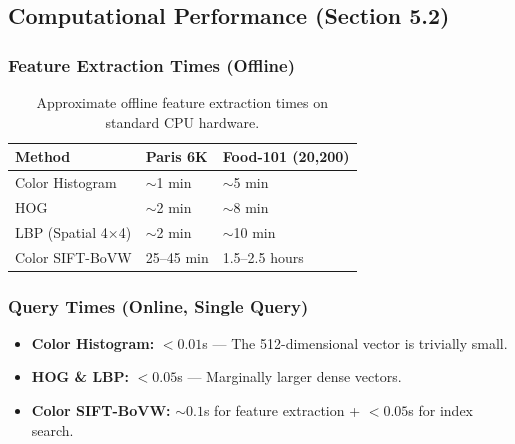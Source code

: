 \documentclass[11pt, a4paper]{article}
\begin{document}
\subsection{Computational Performance (Section 5.2)}

\subsubsection{Feature Extraction Times (Offline)}
\begin{table}[H]
\centering
\begin{tabular}{@{}lll@{}}
\toprule
\textbf{Method} & \textbf{Paris 6K} & \textbf{Food-101 (20,200)} \\ \midrule
Color Histogram & $\sim$1 min & $\sim$5 min \\
HOG & $\sim$2 min & $\sim$8 min \\
LBP (Spatial 4×4) & $\sim$2 min & $\sim$10 min \\
Color SIFT-BoVW & 25–45 min & 1.5–2.5 hours \\ \bottomrule
\end{tabular}
\caption{Approximate offline feature extraction times on standard CPU hardware.}
\label{tab:timing}
\end{table}

\subsubsection{Query Times (Online, Single Query)}
\begin{itemize}
  \item \textbf{Color Histogram:} $< 0.01$s — The 512-dimensional vector is trivially small.
  \item \textbf{HOG \& LBP:} $< 0.05$s — Marginally larger dense vectors.
  \item \textbf{Color SIFT-BoVW:} $\sim 0.1$s for feature extraction + $<0.05$s for index search.
\end{itemize}
\end{document}
